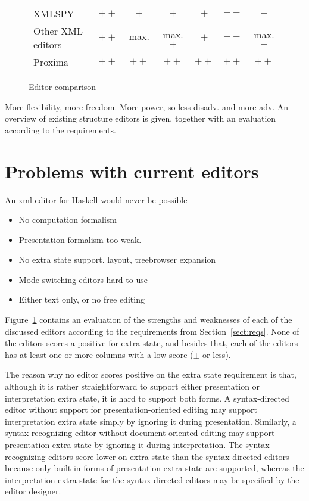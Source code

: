 \documentclass{entcs}
\begin{document}
\begin{figure}
\begin{center}
\begin{scriptsize}
\begin{tabular}[t]{l|c|c|c|c|c|c}
XMLSPY				&   $++$	&   $\pm$	&   $+$ 	&  $\pm$	&   $--$	&   $\pm$	\\
Other XML editors		&   $++$   & max. $-$ & max. $\pm$&  $\pm$&   $--$	&   max. $\pm$	\\
\hline
Proxima				&   $++$	&   $++$	&   $++$ 	&   $++$	&   $++$	&     $++$	\\
\end{tabular}                                                   
\end{scriptsize}
\caption{Editor comparison}\label{scoretable} 
\end{center}
\end{figure}



 
\bc
More flexibility, more freedom. More power, so less disadv. and more adv. An overview of existing structure editors is given, together with an evaluation according to the requirements. 

\section{Problems with current editors}
An xml editor for Haskell would never be possible
\begin{itemize}
\item No computation formalism
\item Presentation formalism too weak. 
\item No extra state support. layout, treebrowser expansion
\item Mode switching editors hard to use
\item Either text only, or no free editing
\end{itemize}
\ec

Figure~\ref{scoretable} contains an evaluation of the strengths and weaknesses of each of the discussed editors according to the requirements from Section~\ref{sect:reqs}. None of the editors scores a positive for extra state, and besides that, each of the editors has at least one or more columns with a low score ($\pm$ or less). 

The reason why no editor scores positive on the extra state requirement is that, although it is rather straightforward to support either presentation or interpretation extra state, it is hard to support both forms. A syntax-directed editor without support for presentation-oriented editing may support interpretation extra state simply by ignoring it during presentation. Similarly, a syntax-recognizing editor without document-oriented editing may support presentation extra state by ignoring it during interpretation. The syntax-recognizing editors score lower on extra state than the syntax-directed editors because only built-in forms of presentation extra state are supported, whereas the interpretation extra state for the syntax-directed editors may be specified by the editor designer.
\end{document}
